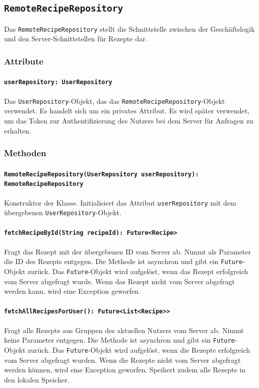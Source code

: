 \documentclass[parskip=full]{scrartcl}
\begin{document}
\subsection{\texttt{RemoteRecipeRepository}}
Das \texttt{RemoteRecipeRepository} stellt die Schnittstelle zwischen der Geschäftslogik und den Server-Schnittstellen für Rezepte dar.
\subsubsection*{Attribute}
\paragraph{\texttt{userRepository: UserRepository}}
Das \texttt{UserRepository}-Objekt, das das \texttt{RemoteRecipeRepository}-Objekt verwendet. Es handelt sich um ein privates Attribut. Es wird später verwendet, um das Token zur Authentifizierung des Nutzers bei dem Server für Anfragen zu erhalten.
\subsubsection*{Methoden}
\paragraph{\texttt{RemoteRecipeRepository(UserRepository userRepository): RemoteRecipeRepository}}
Konstruktor der Klasse. Initialisiert das Attribut \texttt{userRepository} mit dem übergebenen \texttt{UserRepository}-Objekt.
\paragraph{\texttt{fetchRecipeById(String recipeId): Future<Recipe>}}
Fragt das Rezept mit der übergebenen ID vom Server ab. Nimmt als Parameter die ID des Rezepts entgegen. Die Methode ist asynchron und gibt ein \texttt{Future}-Objekt zurück. Das \texttt{Future}-Objekt wird aufgelöst, wenn das Rezept erfolgreich vom Server abgefragt wurde. Wenn das Rezept nicht vom Server abgefragt werden kann, wird eine Exception geworfen.
\paragraph{\texttt{fetchAllRecipesForUser(): Future<List<Recipe>>}}
Fragt alle Rezepte aus Gruppen des aktuellen Nutzers vom Server ab. Nimmt keine Parameter entgegen. Die Methode ist asynchron und gibt ein \texttt{Future}-Objekt zurück. Das \texttt{Future}-Objekt wird aufgelöst, wenn die Rezepte erfolgreich vom Server abgefragt wurden. Wenn die Rezepte nicht vom Server abgefragt werden können, wird eine Exception geworfen. Speihert zudem alle Rezepte in den lokalen Speicher.
\end{document}
